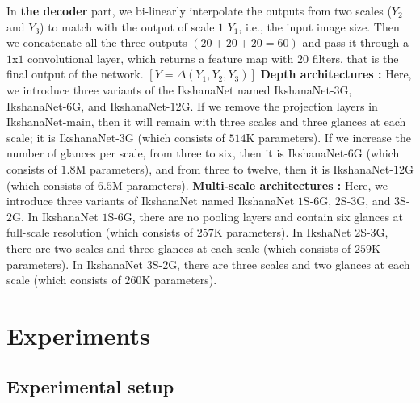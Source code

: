 \documentclass{article}
\begin{document}
In \textbf{the decoder} part, we bi-linearly interpolate the outputs from two scales ($Y_{2}$ and $Y_{3}$) to match with the output of scale $1$ $Y_{1}$, i.e., the input image size. Then we concatenate all the three outputs $(20+20+20=60)$ and pass it through a $1$x$1$ convolutional layer, which returns a feature map with $20$ filters, that is the final output of the network. $[Y=\Delta(Y_{1}, Y_{2},Y_{3})]$ \newline
\textbf{Depth architectures :}
Here, we introduce three variants of the IkshanaNet named IkshanaNet-$3$G, IkshanaNet-$6$G, and IkshanaNet-$12$G.  If we remove the projection layers in IkshanaNet-main, then it will remain with three scales and three glances at each scale; it is IkshanaNet-$3$G (which consists of $514$K parameters). If we increase the number of glances per scale, from three to six, then it is IkshanaNet-$6$G (which consists of $1.8$M parameters), and from three to twelve, then it is IkshanaNet-$12$G (which consists of $6.5$M parameters).\newline
\textbf{Multi-scale architectures :}
Here, we introduce three variants of IkshanaNet named IkshanaNet $1$S-$6$G, $2$S-$3$G, and $3$S-$2$G. In IkshanaNet $1$S-$6$G, there are no pooling layers and contain six glances at full-scale resolution (which consists of $257$K parameters). In IkshaNet $2$S-$3$G, there are two scales and three glances at each scale (which consists of $259$K parameters). In IkshanaNet $3$S-$2$G, there are three scales and two glances at each scale (which consists of $260$K parameters).


\section{Experiments}
\label{4}
\subsection{Experimental setup}
\label{experimental-setup}
\end{document}
